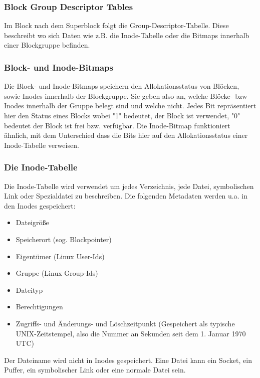 \subsubsection{Block Group Descriptor Tables}

Im Block nach dem Superblock folgt die Group-Descriptor-Tabelle. Diese beschreibt wo sich Daten wie z.B. die Inode-Tabelle oder die Bitmaps innerhalb einer Blockgruppe befinden. 


\subsubsection{Block- und Inode-Bitmaps}

Die Block- und Inode-Bitmaps speichern den Allokationsstatus von Blöcken, sowie Inodes innerhalb der Blockgruppe. Sie geben also an, welche Blöcke- bzw Inodes innerhalb der Gruppe belegt sind und welche nicht. Jedes Bit repräsentiert hier den Status eines Blocks wobei "1" bedeutet, der Block ist verwendet, "0" bedeutet der Block ist frei bzw. verfügbar. Die Inode-Bitmap funktioniert ähnlich, mit dem Unterschied dass die Bits hier auf den Allokationsstatus einer Inode-Tabelle verweisen.

\subsubsection{Die Inode-Tabelle}

Die Inode-Tabelle wird verwendet um jedes Verzeichnis, jede Datei, symbolischen Link oder Spezialdatei zu beschreiben. Die folgenden Metadaten werden u.a. in den Inodes gespeichert:

\begin{itemize}
	\item Dateigröße
	\item Speicherort (sog. Blockpointer)
	\item Eigentümer (Linux User-Ids)
	\item Gruppe (Linux Group-Ids)
	\item Dateityp
	\item Berechtigungen
	\item Zugriffs- und Änderungs- und Löschzeitpunkt (Gespeichert als typische UNIX-Zeitstempel, also die Nummer an Sekunden seit dem 1. Januar 1970 UTC)
\end{itemize}

Der Dateiname wird nicht in Inodes gespeichert. Eine Datei kann ein Socket, ein Puffer, ein symbolischer Link oder eine normale Datei sein.

